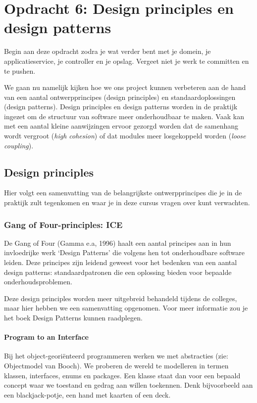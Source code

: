 \chapter{Opdracht 6: Design principles en design patterns}
Begin aan deze opdracht zodra je wat verder bent 
met je domein, je applicatieservice, je controller en je opslag.
Vergeet niet je werk te committen en te pushen.

We gaan nu namelijk kijken hoe we ons project kunnen verbeteren aan de hand van 
een aantal ontwerpprincipes (design principles) en standaardoplossingen (design patterns).
Design principles en design patterns worden in de praktijk ingezet om 
de structuur van software meer onderhoudbaar te maken. Vaak kan met een aantal kleine 
aanwijzingen ervoor gezorgd worden dat de samenhang wordt vergroot (\textit{high cohesion})
of dat modules meer losgekoppeld worden (\textit{loose coupling}).

\section{Design principles}
Hier volgt een samenvatting van de belangrijkste ontwerpprincipes die je in de praktijk 
zult tegenkomen en waar je in deze cursus vragen over kunt verwachten.

\subsection{Gang of Four-principles: ICE}
De Gang of Four (Gamma e.a, 1996) haalt een aantal principes aan 
in hun invloedrijke werk `Design Patterns' die volgens hen tot onderhoudbare 
software leiden. Deze principes zijn leidend geweest voor het bedenken 
van een aantal design patterns: standaardpatronen die een oplossing bieden 
voor bepaalde onderhoudsproblemen.

Deze design principles worden meer uitgebreid behandeld tijdens de colleges,
maar hier hebben we een samenvatting opgenomen. Voor meer informatie zou 
je het boek Design Patterns kunnen raadplegen.

\subsubsection{Program to an Interface}
Bij het object-georiënteerd programmeren werken we met abstracties (zie: Objectmodel van Booch).
We proberen de wereld te modelleren in termen klassen, interfaces, enums en packages.
Een klasse staat dan voor een bepaald concept waar we toestand en gedrag aan willen 
toekennen. Denk bijvoorbeeld aan een blackjack-potje, een hand met kaarten of een deck.

